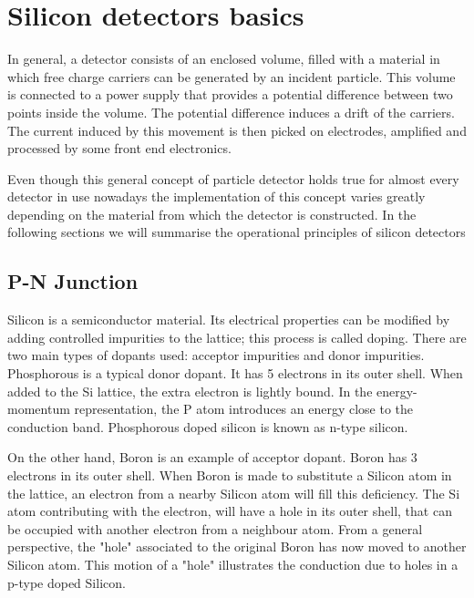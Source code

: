 \chapter{Silicon detectors basics} %
\label{cha:simulator_development}

In general, a detector consists of an enclosed volume, filled with a material in which free charge carriers can be generated by an incident particle. This volume is connected to a power supply that provides a  potential difference between two points inside the volume. The potential difference induces a drift of the carriers. The current induced by this movement is then picked on electrodes, amplified and processed by some front end electronics.

Even though this general concept of particle detector holds true for almost every detector in use nowadays the implementation of this concept varies greatly depending on the material from which the detector is constructed. In the following sections we will summarise the operational principles of silicon detectors

\section{P-N Junction}

Silicon is a semiconductor material. Its electrical properties can be modified by adding controlled impurities to the lattice; this process is called doping. There are two main types of dopants used: acceptor impurities and donor impurities. Phosphorous is a typical donor dopant. It has 5 electrons in its outer shell. When added to the Si lattice, the extra electron is lightly bound. In the energy-momentum representation, the P atom introduces an energy close to the conduction band. Phosphorous doped silicon is known as n-type silicon. 

On the other hand, Boron is an example of acceptor dopant. Boron has 3 electrons in its outer shell. When Boron is made to substitute a Silicon atom in the lattice, an electron from a nearby Silicon atom will fill this deficiency. The Si atom contributing with the electron, will have a hole in its outer shell, that can be occupied with another electron from a neighbour atom. From a general perspective, the "hole" associated to the original Boron has now moved to another Silicon atom. This motion of a "hole" illustrates the conduction due to holes in a p-type doped Silicon.

